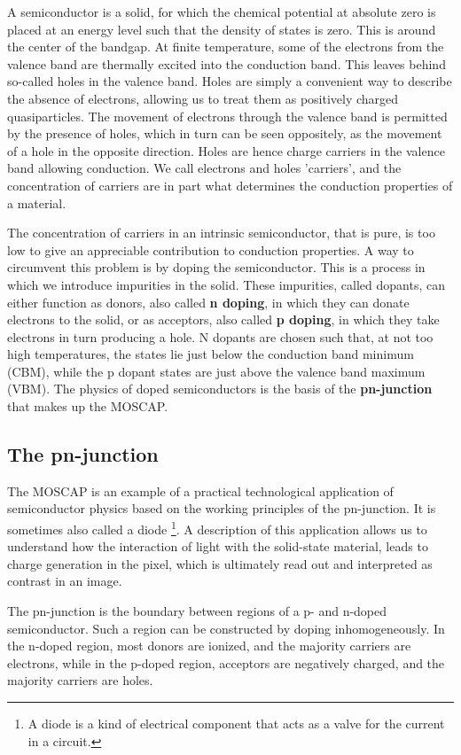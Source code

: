 \documentclass[../main.tex]{subfiles}
\begin{document}
	A semiconductor is a solid, for which the chemical potential at absolute zero is placed at an energy level such that the density of states is zero. This is around the center of the bandgap. At finite temperature, some of the electrons from the valence band are thermally excited into the conduction band. This leaves behind so-called holes in the valence band. Holes are simply a convenient way to describe the absence of electrons, allowing us to treat them as positively charged quasiparticles. The movement of electrons through the valence band is permitted by the presence of holes, which in turn can be seen oppositely, as the movement of a hole in the opposite direction. Holes are hence charge carriers in the valence band allowing conduction. We call electrons and holes 'carriers', and the concentration of carriers are in part what determines the conduction properties of a material. 
	
	The concentration of carriers in an intrinsic semiconductor, that is pure, is too low to give an appreciable contribution to conduction properties. A way to circumvent this problem is by doping the semiconductor. This is a process in which we introduce impurities in the solid. These impurities, called dopants, can either function as donors, also called \textbf{n doping}, in which they can donate electrons to the solid, or as acceptors, also called \textbf{p doping}, in which they take electrons in turn producing a hole. N dopants are chosen such that, at not too high temperatures, the states lie just below the conduction band minimum (CBM), while the p dopant states are just above the valence band maximum (VBM). The physics of doped semiconductors is the basis of the \textbf{pn-junction} that makes up the MOSCAP.
	
	\subsection{The pn-junction} 
	The MOSCAP is an example of a practical technological application of semiconductor physics based on the working principles of the pn-junction. It is sometimes also called a diode \footnote{A diode is a kind of electrical component that acts as a valve for the current in a circuit.}. A description of this application allows us to understand how the interaction of light with the solid-state material, leads to charge generation in the pixel, which is ultimately read out and interpreted as contrast in an image. 
	
	The pn-junction is the boundary between regions of a p- and n-doped semiconductor. Such a region can be constructed by doping inhomogeneously. In the n-doped region, most donors are ionized, and the majority carriers are electrons, while in the p-doped region, acceptors are negatively charged, and the majority carriers are holes. 
	
\end{document}
